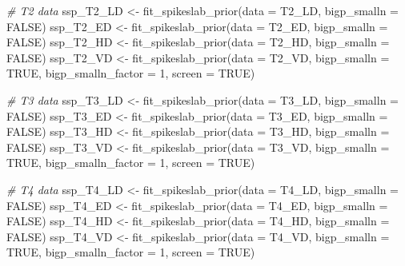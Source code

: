 \documentclass[
  11pt,
]{article}
\newenvironment{Shaded}{}{}
\newcommand{\AttributeTok}[1]{\textcolor[rgb]{0.49,0.56,0.16}{#1}}
\newcommand{\CommentTok}[1]{\textcolor[rgb]{0.38,0.63,0.69}{\textit{#1}}}
\newcommand{\ConstantTok}[1]{\textcolor[rgb]{0.53,0.00,0.00}{#1}}
\newcommand{\DecValTok}[1]{\textcolor[rgb]{0.25,0.63,0.44}{#1}}
\newcommand{\FunctionTok}[1]{\textcolor[rgb]{0.02,0.16,0.49}{#1}}
\newcommand{\NormalTok}[1]{#1}
\newcommand{\OtherTok}[1]{\textcolor[rgb]{0.00,0.44,0.13}{#1}}
\begin{document}
\begin{Shaded}
\begin{Highlighting}[]
\CommentTok{\# T2 data}
\NormalTok{ssp\_T2\_LD }\OtherTok{\textless{}{-}} \FunctionTok{fit\_spikeslab\_prior}\NormalTok{(}\AttributeTok{data =}\NormalTok{ T2\_LD, }\AttributeTok{bigp\_smalln =} \ConstantTok{FALSE}\NormalTok{)}
\NormalTok{ssp\_T2\_ED }\OtherTok{\textless{}{-}} \FunctionTok{fit\_spikeslab\_prior}\NormalTok{(}\AttributeTok{data =}\NormalTok{ T2\_ED, }\AttributeTok{bigp\_smalln =} \ConstantTok{FALSE}\NormalTok{)}
\NormalTok{ssp\_T2\_HD }\OtherTok{\textless{}{-}} \FunctionTok{fit\_spikeslab\_prior}\NormalTok{(}\AttributeTok{data =}\NormalTok{ T2\_HD, }\AttributeTok{bigp\_smalln =} \ConstantTok{FALSE}\NormalTok{)}
\NormalTok{ssp\_T2\_VD }\OtherTok{\textless{}{-}} \FunctionTok{fit\_spikeslab\_prior}\NormalTok{(}\AttributeTok{data =}\NormalTok{ T2\_VD, }\AttributeTok{bigp\_smalln =} \ConstantTok{TRUE}\NormalTok{, }
                                 \AttributeTok{bigp\_smalln\_factor =} \DecValTok{1}\NormalTok{, }\AttributeTok{screen =} \ConstantTok{TRUE}\NormalTok{)}

\CommentTok{\# T3 data}
\NormalTok{ssp\_T3\_LD }\OtherTok{\textless{}{-}} \FunctionTok{fit\_spikeslab\_prior}\NormalTok{(}\AttributeTok{data =}\NormalTok{ T3\_LD, }\AttributeTok{bigp\_smalln =} \ConstantTok{FALSE}\NormalTok{)}
\NormalTok{ssp\_T3\_ED }\OtherTok{\textless{}{-}} \FunctionTok{fit\_spikeslab\_prior}\NormalTok{(}\AttributeTok{data =}\NormalTok{ T3\_ED, }\AttributeTok{bigp\_smalln =} \ConstantTok{FALSE}\NormalTok{)}
\NormalTok{ssp\_T3\_HD }\OtherTok{\textless{}{-}} \FunctionTok{fit\_spikeslab\_prior}\NormalTok{(}\AttributeTok{data =}\NormalTok{ T3\_HD, }\AttributeTok{bigp\_smalln =} \ConstantTok{FALSE}\NormalTok{)}
\NormalTok{ssp\_T3\_VD }\OtherTok{\textless{}{-}} \FunctionTok{fit\_spikeslab\_prior}\NormalTok{(}\AttributeTok{data =}\NormalTok{ T3\_VD, }\AttributeTok{bigp\_smalln =} \ConstantTok{TRUE}\NormalTok{, }
                                 \AttributeTok{bigp\_smalln\_factor =} \DecValTok{1}\NormalTok{, }\AttributeTok{screen =} \ConstantTok{TRUE}\NormalTok{)}

\CommentTok{\# T4 data}
\NormalTok{ssp\_T4\_LD }\OtherTok{\textless{}{-}} \FunctionTok{fit\_spikeslab\_prior}\NormalTok{(}\AttributeTok{data =}\NormalTok{ T4\_LD, }\AttributeTok{bigp\_smalln =} \ConstantTok{FALSE}\NormalTok{)}
\NormalTok{ssp\_T4\_ED }\OtherTok{\textless{}{-}} \FunctionTok{fit\_spikeslab\_prior}\NormalTok{(}\AttributeTok{data =}\NormalTok{ T4\_ED, }\AttributeTok{bigp\_smalln =} \ConstantTok{FALSE}\NormalTok{)}
\NormalTok{ssp\_T4\_HD }\OtherTok{\textless{}{-}} \FunctionTok{fit\_spikeslab\_prior}\NormalTok{(}\AttributeTok{data =}\NormalTok{ T4\_HD, }\AttributeTok{bigp\_smalln =} \ConstantTok{FALSE}\NormalTok{)}
\NormalTok{ssp\_T4\_VD }\OtherTok{\textless{}{-}} \FunctionTok{fit\_spikeslab\_prior}\NormalTok{(}\AttributeTok{data =}\NormalTok{ T4\_VD, }\AttributeTok{bigp\_smalln =} \ConstantTok{TRUE}\NormalTok{, }
                                 \AttributeTok{bigp\_smalln\_factor =} \DecValTok{1}\NormalTok{, }\AttributeTok{screen =} \ConstantTok{TRUE}\NormalTok{)}


\end{Highlighting}
\end{Shaded}
\end{document}
